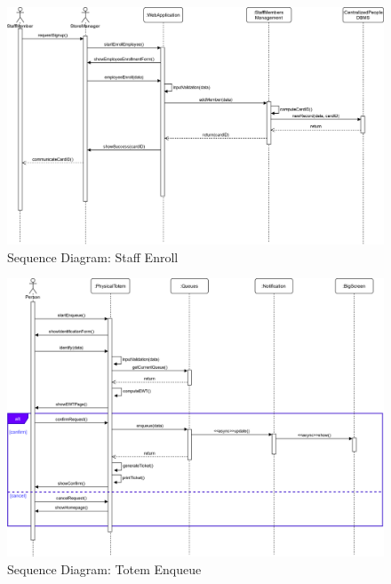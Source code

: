 \begin{figure}[H]
	\includegraphics[width=\linewidth]{../Diagrams/Sequence/sequence_staff_enroll.png}
	\caption{Sequence Diagram: Staff Enroll}
	\label{fig:sStaffEn}
\end{figure}
\begin{figure}[H]
	\includegraphics[width=\linewidth]{../Diagrams/Sequence/sequence_totem_enqueue.png}
	\caption{Sequence Diagram: Totem Enqueue}
	\label{fig:sTotemEnq}
\end{figure}


